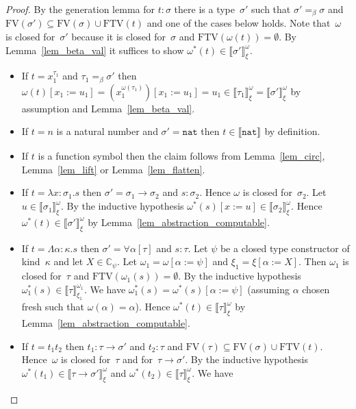 \documentclass[runningheads,a4paper]{llncs}
\newcommand{\arrtype}{\rightarrow}
\newcommand{\abs}[2]{\lambda #1.#2}
\newcommand{\tabs}[2]{\Lambda #1.#2}
\newcommand{\subst}[2]{#1:=#2}
\newcommand{\FTV}{\mathrm{FTV}}
\newcommand{\FV}{\mathrm{FV}}
\newcommand{\nat}{\mathtt{nat}}
\newcommand{\Cb}{\mathbb{C}}
\newcommand{\val}[3]{\ensuremath{\llbracket#1\rrbracket_{#2}^{#3}}}
\begin{document}
\begin{proof}
  By the generation lemma for $t : \sigma$ there is a type~$\sigma'$
  such that $\sigma' =_\beta \sigma$ and $\FV(\sigma') \subseteq
  \FV(\sigma) \cup \FTV(t)$ and one of the cases below holds. Note
  that~$\omega$ is closed for~$\sigma'$ because it is closed
  for~$\sigma$ and $\FTV(\omega(t)) = \emptyset$. By
  Lemma~\ref{lem_beta_val} it suffices to show $\omega^*(t) \in
  \val{\sigma'}{\xi}{\omega}$.
  \begin{itemize}
  \item If $t = x_1^{\tau_1}$ and $\tau_1 =_\beta \sigma'$ then
    $\omega(t)[\subst{x_1}{u_1}] =
    (x_1^{\omega(\tau_1)})[\subst{x_1}{u_1}] = u_1 \in
    \val{\tau_1}{\xi}{\omega} = \val{\sigma'}{\xi}{\omega}$ by
    assumption and Lemma~\ref{lem_beta_val}.
  \item If $t = n$ is a natural number and $\sigma' = \nat$ then $t
    \in \val{\nat}{}{}$ by definition.
  \item If $t$ is a function symbol then the claim follows from
    Lemma~\ref{lem_circ}, Lemma~\ref{lem_lift} or
    Lemma~\ref{lem_flatten}.
  \item If $t = \abs{x:\sigma_1}{s}$ then
    $\sigma' = \sigma_1\arrtype\sigma_2$ and $s : \sigma_2$. Hence
    $\omega$ is closed for~$\sigma_2$. Let
    $u \in \val{\sigma_1}{\xi}{\omega}$. By the inductive hypothesis
    $\omega^*(s)[\subst{x}{u}] \in \val{\sigma_2}{\xi}{\omega}$. Hence
    $\omega^*(t) \in \val{\sigma'}{\xi}{\omega}$ by
    Lemma~\ref{lem_abstraction_computable}.
  \item If $t = \tabs{\alpha:\kappa}{s}$ then $\sigma' =
    \forall\alpha[\tau]$ and $s : \tau$. Let $\psi$ be a closed type
    constructor of kind~$\kappa$ and let $X \in \Cb_\psi$. Let
    $\omega_1 = \omega[\subst{\alpha}{\psi}]$ and
    $\xi_1=\xi[\subst{\alpha}{X}]$. Then $\omega_1$ is closed
    for~$\tau$ and $\FTV(\omega_1(s)) = \emptyset$. By the inductive
    hypothesis $\omega_1^*(s) \in \val{\tau}{\xi_1}{\omega_1}$. We
    have $\omega_1^*(s) = \omega^*(s)[\subst{\alpha}{\psi}]$ (assuming
    $\alpha$ chosen fresh such that $\omega(\alpha) = \alpha$). Hence
    $\omega^*(t) \in \val{\tau}{\xi}{\omega}$ by
    Lemma~\ref{lem_abstraction_computable}.
  \item If $t = t_1 t_2$ then $t_1 : \tau\arrtype\sigma'$ and
    $t_2 : \tau$ and $\FV(\tau) \subseteq \FV(\sigma) \cup
    \FTV(t)$. Hence~$\omega$ is closed for~$\tau$ and
    for~$\tau\arrtype\sigma'$. By the inductive hypothesis
    $\omega^*(t_1) \in \val{\tau\arrtype\sigma'}{\xi}{\omega}$ and
    $\omega^*(t_2) \in \val{\tau}{\xi}{\omega}$. We have

\end{itemize}
\end{proof}
\end{document}
